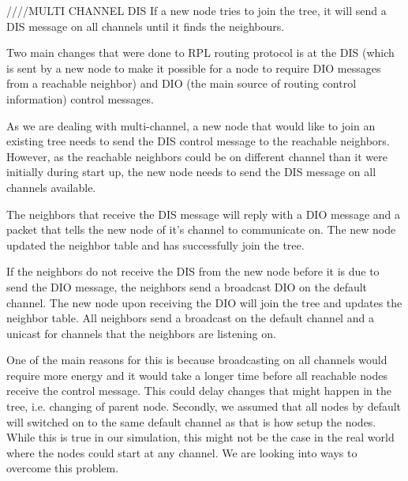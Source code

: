 ////MULTI CHANNEL DIS
If a new node tries to join the tree, it will send a DIS message on all channels until it finds the neighbours. 

Two main changes that were done to RPL routing protocol is at the DIS (which is sent by a new node to make it possible for a node to require DIO messages from a reachable neighbor) and DIO (the main source of routing control information) control messages.

As we are dealing with multi-channel, a new node that would like to join an existing tree needs to send the DIS control message to the reachable neighbors. However, as the reachable neighbors could be on different channel than it were initially during start up, the new node needs to send the DIS message on all channels available. 

The neighbors that receive the DIS message will reply with a DIO message and a packet that tells the new node of it's channel to communicate on. The new node updated the neighbor table and has successfully join the tree. 

If the neighbors do not receive the DIS from the new node before it is due to send the DIO message, the neighbors send a broadcast DIO on the default channel. The new node upon receiving the DIO will join the tree and updates the neighbor table. All neighbors send a broadcast on the default channel and a unicast for channels that the neighbors are listening on. 

One of the main reasons for this is because broadcasting on all channels would require more energy and it would take a longer time before all reachable nodes receive the control message. This could delay changes that might happen in the tree, i.e. changing of parent node. Secondly, we assumed that all nodes by default will switched on to the same default channel as that is how setup the nodes. While this is true in our simulation, this might not be the case in the real world where the nodes could start at any channel. We are looking into ways to overcome this problem.


